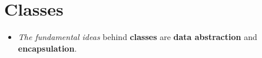\section{Classes}
\begin{itemize}

\item
\textit{The fundamental ideas} behind \textbf{classes} are \textbf{data abstraction} and \textbf{encapsulation}.

\end{itemize}